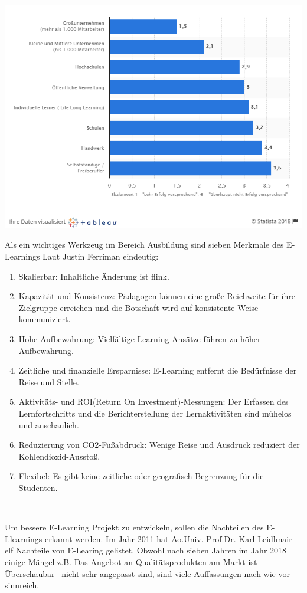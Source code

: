 \includegraphics[width=\textwidth]{images/zielgruppe.png}

Als ein wichtiges Werkzeug im Bereich Ausbildung sind sieben Merkmale des E-Learnings Laut Justin Ferriman \citep{6} eindeutig:

\begin{enumerate}
\item Skalierbar: Inhaltliche Änderung ist flink. 
\item Kapazität und Konsistenz: Pädagogen können eine große Reichweite für ihre Zielgruppe erreichen und die Botschaft wird auf konsistente Weise kommuniziert.
\item Hohe Aufbewahrung: Vielfältige Learning-Ansätze führen zu höher Aufbewahrung.
\item Zeitliche und finanzielle Ersparnisse: E-Learning entfernt die Bedürfnisse der Reise und Stelle.
\item Aktivitäts- und ROI(Return On Investment)-Messungen: Der Erfassen des Lernfortschritts und die Berichterstellung der Lernaktivitäten sind mühelos und anschaulich.
\item Reduzierung von CO2-Fußabdruck: Wenige Reise und Ausdruck reduziert der Kohlendioxid-Ausstoß.
\item Flexibel: Es gibt keine zeitliche oder geografisch Begrenzung für die Studenten.
\end{enumerate}\

Um bessere E-Learning Projekt zu entwickeln, sollen die Nachteilen des E-Llearnings erkannt werden. Im Jahr 2011 hat Ao.Univ.-Prof.Dr. Karl Leidlmair\citep{7} elf Nachteile von E-Learing gelistet. Obwohl nach sieben Jahren im Jahr 2018 einige Mängel z.B. \glqq Das Angebot an Qualitätsprodukten am Markt ist Überschaubar \grqq\ nicht sehr angepasst sind, sind viele Auffassungen nach wie vor sinnreich.

